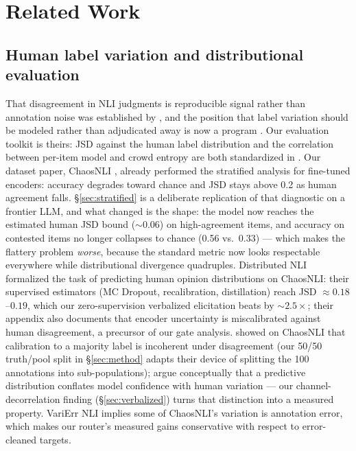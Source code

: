 \documentclass[11pt]{article}
\begin{document}
\section{Related Work}
\label{sec:related}

\subsection{Human label variation and distributional evaluation}
\label{sec:related-hlv}

That disagreement in NLI judgments is reproducible signal rather than annotation noise was established by \citet{pavlick2019inherent}, and the position that label variation should be modeled rather than adjudicated away is now a program \citep{plank2022problem,uma2021learning,basile2021weneed,cabitza2023perspectivist}. Our evaluation toolkit is theirs: JSD against the human label distribution and the correlation between per-item model and crowd entropy are both standardized in \citet{uma2021learning}. Our dataset paper, ChaosNLI \citep{nie2020chaosnli}, already performed the stratified analysis for fine-tuned encoders: accuracy degrades toward chance and JSD stays above 0.2 as human agreement falls. \S\ref{sec:stratified} is a deliberate replication of that diagnostic on a frontier LLM, and what changed is the shape: the model now reaches the estimated human JSD bound (${\sim}0.06$) on high-agreement items, and accuracy on contested items no longer collapses to chance (0.56 vs.\ 0.33) --- which makes the flattery problem \emph{worse}, because the standard metric now looks respectable everywhere while distributional divergence quadruples. Distributed NLI \citep{zhou2022distributed} formalized the task of predicting human opinion distributions on ChaosNLI: their supervised estimators (MC Dropout, recalibration, distillation) reach JSD $\approx 0.18$--$0.19$, which our zero-supervision verbalized elicitation beats by ${\sim}2.5\times$; their appendix also documents that encoder uncertainty is miscalibrated against human disagreement, a precursor of our gate analysis. \citet{baan2022stop} showed on ChaosNLI that calibration to a majority label is incoherent under disagreement (our 50/50 truth/pool split in \S\ref{sec:method} adapts their device of splitting the 100 annotations into sub-populations); \citet{baan2024interpreting} argue conceptually that a predictive distribution conflates model confidence with human variation --- our channel-decorrelation finding (\S\ref{sec:verbalized}) turns that distinction into a measured property. VariErr NLI \citep{webergenzel2024varierr} implies some of ChaosNLI's variation is annotation error, which makes our router's measured gains conservative with respect to error-cleaned targets.
\end{document}
